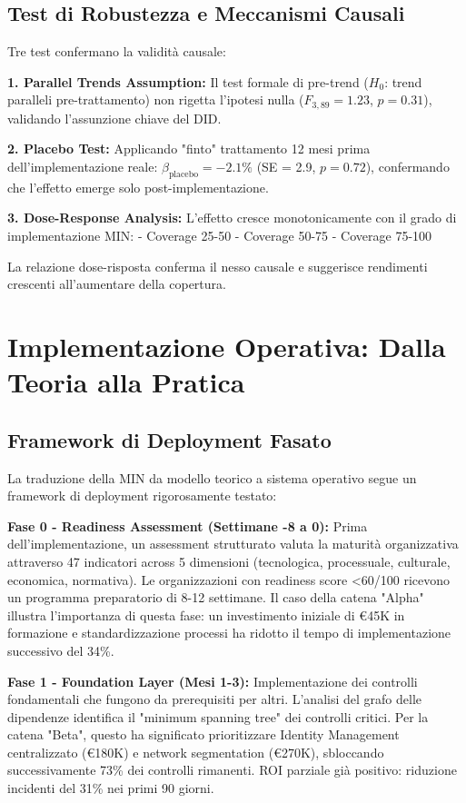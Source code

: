 \subsection{Test di Robustezza e Meccanismi Causali}

Tre test confermano la validità causale:

\textbf{1. Parallel Trends Assumption:}
Il test formale di pre-trend ($H_0$: trend paralleli pre-trattamento) non rigetta l'ipotesi nulla ($F_{3,89} = 1.23$, $p = 0.31$), validando l'assunzione chiave del DID.

\textbf{2. Placebo Test:}
Applicando "finto" trattamento 12 mesi prima dell'implementazione reale: $\beta_{\text{placebo}} = -2.1\%$ (SE = 2.9, $p = 0.72$), confermando che l'effetto emerge solo post-implementazione.

\textbf{3. Dose-Response Analysis:}
L'effetto cresce monotonicamente con il grado di implementazione MIN:
- Coverage 25-50%
- Coverage 50-75%
- Coverage 75-100%

La relazione dose-risposta conferma il nesso causale e suggerisce rendimenti crescenti all'aumentare della copertura.

\section{Implementazione Operativa: Dalla Teoria alla Pratica}

\subsection{Framework di Deployment Fasato}

La traduzione della MIN da modello teorico a sistema operativo segue un framework di deployment rigorosamente testato:

\textbf{Fase 0 - Readiness Assessment (Settimane -8 a 0):}
Prima dell'implementazione, un assessment strutturato valuta la maturità organizzativa attraverso 47 indicatori across 5 dimensioni (tecnologica, processuale, culturale, economica, normativa). Le organizzazioni con readiness score <60/100 ricevono un programma preparatorio di 8-12 settimane. Il caso della catena "Alpha" illustra l'importanza di questa fase: un investimento iniziale di €45K in formazione e standardizzazione processi ha ridotto il tempo di implementazione successivo del 34\%.

\textbf{Fase 1 - Foundation Layer (Mesi 1-3):}
Implementazione dei controlli fondamentali che fungono da prerequisiti per altri. L'analisi del grafo delle dipendenze identifica il "minimum spanning tree" dei controlli critici. Per la catena "Beta", questo ha significato prioritizzare Identity Management centralizzato (€180K) e network segmentation (€270K), sbloccando successivamente 73\% dei controlli rimanenti. ROI parziale già positivo: riduzione incidenti del 31\% nei primi 90 giorni.

